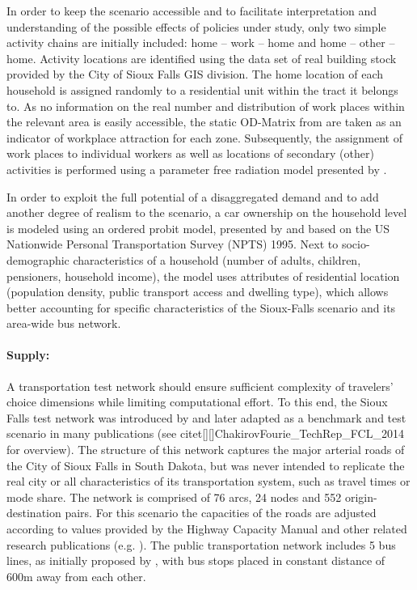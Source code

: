 In order to keep the scenario accessible and to facilitate interpretation and understanding of the possible effects of policies under study, only two simple activity chains are initially included: home – work – home and home – other – home. Activity locations are identified using the data set of real building stock provided by the City of Sioux Falls GIS division. The home location of each household is assigned randomly to a residential unit within the tract it belongs to. As no information on the real number and distribution of work places within the relevant area is easily accessible, the static OD-Matrix from \citet[][]{LeBlancEtAl_TransRes_1975} are taken as an indicator of workplace attraction for each zone. Subsequently, the assignment of work places to individual workers as well as locations of secondary (other) activities is performed using a parameter free radiation model presented by \citet[][]{SiminiEtAl_NAT_2012}.

In order to exploit the full potential of a disaggregated demand and to add another degree of realism to the scenario, a car ownership on the household level is modeled using an ordered probit model, presented by \cite[][]{GiulianoDargay_TransResA_2006} and based on the US Nationwide Personal Transportation Survey (NPTS) 1995. Next to socio-demographic characteristics of a household (number of adults, children, pensioners, household income), the model uses attributes of residential location (population density, public transport access and dwelling type), which allows better accounting for specific characteristics of the Sioux-Falls scenario and its area-wide bus network. 

\paragraph{Supply:} 

A transportation test network should ensure sufficient complexity of travelers’ choice dimensions while limiting computational effort. To this end, the Sioux Falls test network was introduced by \citet[][]{MorlokEtAl_ResRep_org-fhwa_1973} and later adapted as a benchmark and test scenario in many publications (see citet[][]{ChakirovFourie_TechRep_FCL_2014} for overview). The structure of this network captures the major arterial roads of the City of Sioux Falls in South Dakota, but was never intended to replicate the real city or all characteristics of its transportation system, such as travel times or mode share. The network is comprised of 76 arcs, 24 nodes and 552 origin-destination pairs. For this scenario the capacities of the roads are adjusted according to values provided by the Highway Capacity Manual \citet[][]{HCM_2010} and other related research publications (e.g. \citet[][]{NgCFSmall_Transportation_2012}). The public transportation network includes 5 bus lines, as initially proposed by \citet[][]{AbdulaalLeBlanc_TransScience_1979}, with bus stops placed in constant distance of 600m away from each other. 

